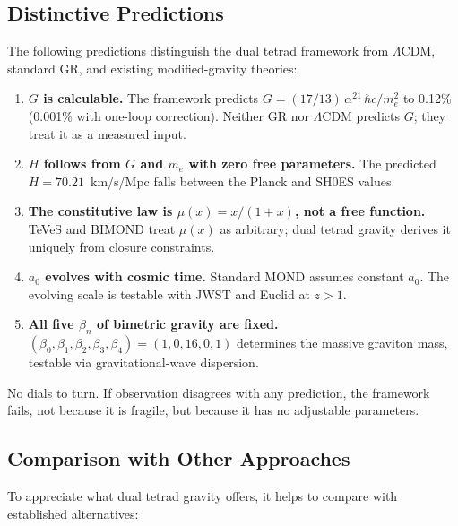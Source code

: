 \documentclass[aps,prd,preprint,superscriptaddress,showpacs,preprintnumbers,amsmath,amssymb,nofootinbib]{revtex4-2}
\begin{document}
\subsection{Distinctive Predictions}
\label{subsec:predictions}

The following predictions distinguish the dual tetrad framework from $\Lambda$CDM, standard GR, and existing modified-gravity theories:
\begin{enumerate}[leftmargin=2em]
\item \textbf{$G$ is calculable.} The framework predicts $G = (17/13)\,\alpha^{21}\,\hbar c/m_e^2$ to 0.12\% (0.001\% with one-loop correction). Neither GR nor $\Lambda$CDM predicts $G$; they treat it as a measured input.
\item \textbf{$H$ follows from $G$ and $m_e$ with zero free parameters.} The predicted $H = 70.21$~km/s/Mpc falls between the Planck and SH0ES values.
\item \textbf{The constitutive law is $\mu(x) = x/(1+x)$, not a free function.} TeVeS and BIMOND treat $\mu(x)$ as arbitrary; dual tetrad gravity derives it uniquely from closure constraints.
\item \textbf{$a_0$ evolves with cosmic time.} Standard MOND assumes constant $a_0$. The evolving scale is testable with JWST and Euclid at $z > 1$.
\item \textbf{All five $\beta_n$ of bimetric gravity are fixed.} $(\beta_0,\beta_1,\beta_2,\beta_3,\beta_4) = (1,0,16,0,1)$ determines the massive graviton mass, testable via gravitational-wave dispersion.
\end{enumerate}

No dials to turn. If observation disagrees with any prediction, the framework fails, not because it is fragile, but because it has no adjustable parameters.

\subsection{Comparison with Other Approaches}
\label{subsec:comparison}

To appreciate what dual tetrad gravity offers, it helps to compare with established alternatives:
\end{document}
